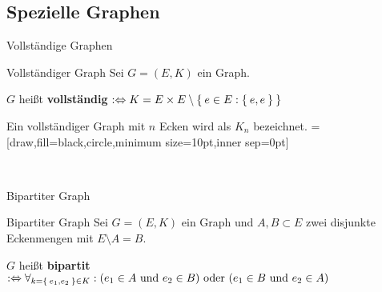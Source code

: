 \subsection{Spezielle Graphen}
\begin{frame}{Vollständige Graphen}
\begin{block}{Vollständiger Graph}
Sei $G = (E, K)$ ein Graph.

$G$ heißt \textbf{vollständig} $:\Leftrightarrow K = E \times E \setminus \Set{e \in E: \Set{e, e}}$
\end{block}

Ein vollständiger Graph mit $n$ Ecken wird als $K_n$ bezeichnet.
\pause
{}=[draw,fill=black,circle,minimum size=10pt,inner sep=0pt]
\begin{gallery}
    \\
\end{gallery}
\end{frame}

\begin{frame}{Bipartiter Graph}
\begin{block}{Bipartiter Graph}
Sei $G = (E, K)$ ein Graph und $A, B \subset E$ zwei disjunkte Eckenmengen mit
$E \setminus A = B$.

$G$ heißt \textbf{bipartit} $:\Leftrightarrow \forall_{k = \Set{e_1, e_2} \in K}: (e_1 \in A \text{ und } e_2 \in B) \text{ oder } (e_1 \in B \text{ und } e_2 \in A) $
\end{block}

\begin{gallery}
    \\
\end{gallery}
\end{frame}


